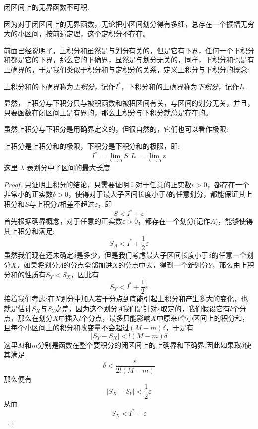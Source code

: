 \begin{inference}
  \label{no-bound-function-not-integrable}
  闭区间上的无界函数不可积.
\end{inference}
因为对于闭区间上的无界函数，无论把小区间划分得有多细，总存在一个振幅无穷大的小区间，按前述定理，这个定积分不存在。

前面已经说明了，上积分和虽然是与划分有关的，但是它有下界，任何一个下积分和都是它的下界，那么它的下确界，显然是与划分无关的，同样，下积分和也是有上确界的，于是我们类似于积分和与定积分的关系，定义上积分与下积分的概念:
\begin{definition}[上积分与下积分]
  上积分和的下确界称为\emph{上积分}，记作$I^{*}$，下积分和的上确界称为\emph{下积分}，记作$I_{*}$.
\end{definition}
显然，上积分与下积分只与被积函数和被积区间有关，与区间的划分无关，并且，只要函数在闭区间上是有界的，那么上积分与下积分就总是存在的。

虽然上积分与下积分是用确界定义的，但很自然的，它们也可以看作极限:
\begin{theorem}
  上积分是上积分和的极限，下积分是下积分和的极限，即:
  \[ I^{*} = \lim_{\lambda \to 0} S, I_{*} = \lim_{\lambda \to 0} s  \]
  这里 $\lambda$ 表划分中子区间的最大长度.
\end{theorem}

\begin{proof}
  只证明上积分的结论，只需要证明：对于任意的正实数$\varepsilon>0$，都存在一个非常小的正实数$\delta>0$，使得对于最大子区间长度小于$\delta$的任意划分，都能保证其上积分和$S$与上积分$I$相差不超过$\varepsilon$，即
  \[ S<I^{*}+ \varepsilon \]
  首先根据确界概念，对于任意的正实数$\varepsilon>0$，都存在一个划分(记作$A$)，能够使得其上积分和满足:
  \[ S_A<I^{*}+\frac{1}{2}\varepsilon \]
  虽然我们现在还未确定$\delta$是多少，但是我们考虑最大子区间长度小于$\delta$的任意一个划分$X$，如果将划分$A$的分点全部加进$X$的分点中去，得到一个新划分$Y$，那么由上积分和的性质有$S_Y<S_X$，因此有
  \[ S_Y<I^{*}+\frac{1}{2}\varepsilon \]
  接着我们考虑:在$X$划分中加入若干分点到底能引起上积分和产生多大的变化，也就是估计$S_X$与$S_Y$之差，因为这个划分$A$我们是针对$\varepsilon$取定的，我们假设它有$l$个分点，那么在划分$X$中插入$l$个分点，最多只能影响$X$中原来$l$个小区间上的积分和，且每个小区间上的积分和改变量不会超过$(M-m)\delta$，于是有
  \[ |S_Y-S_X|<l(M-m)\delta \]
  这里$M$和$m$分别是函数在整个要积分的闭区间上的上确界和下确界.因此如果取$\delta$使其满足
  \[ \delta < \frac{\varepsilon}{2l(M-m)} \]
  那么便有
  \[ |S_X-S_Y| < \frac{1}{2}\varepsilon \]
  从而
  \[ S_X < I^{*} + \varepsilon \]
\end{proof}


